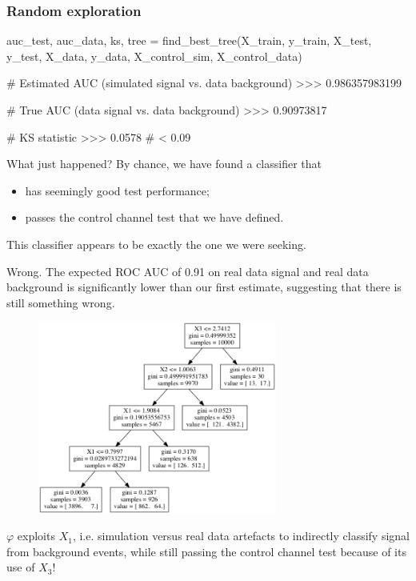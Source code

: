 \documentclass{beamer}
\begin{document}
\begin{frame}[fragile]
  \frametitle{Random exploration}

{\scriptsize
\begin{pythoncode}
auc_test, auc_data, ks, tree = find_best_tree(X_train, y_train,
                                              X_test, y_test,
                                              X_data, y_data,
                                              X_control_sim, X_control_data)

# Estimated AUC (simulated signal vs. data background)
>>> 0.986357983199

# True AUC (data signal vs. data background)
>>> 0.90973817

# KS statistic
>>> 0.0578  # < 0.09
\end{pythoncode}
}

\end{frame}

\begin{frame}
What just happened? By chance, we have found a classifier that
\begin{itemize}
\item has seemingly good test performance;
\item passes the control channel test that we have defined.
\end{itemize}
{\color{blue} This classifier appears to be exactly the one we were seeking}.
\vspace{1cm}

{\color{red}Wrong}. The expected ROC AUC of 0.91 on real data signal and real data
background is significantly lower than our first estimate, suggesting that
there is still something wrong.

\end{frame}

\begin{frame}
\begin{figure}
\centering
\includegraphics[width=0.7\textwidth]{tree.png}
\end{figure}

$\varphi$ exploits $X_1$, i.e. simulation versus real data
artefacts to indirectly classify signal from background events, {\color{red}while still passing the
control channel test} because of its use of $X_3$!

\end{frame}
\end{document}
